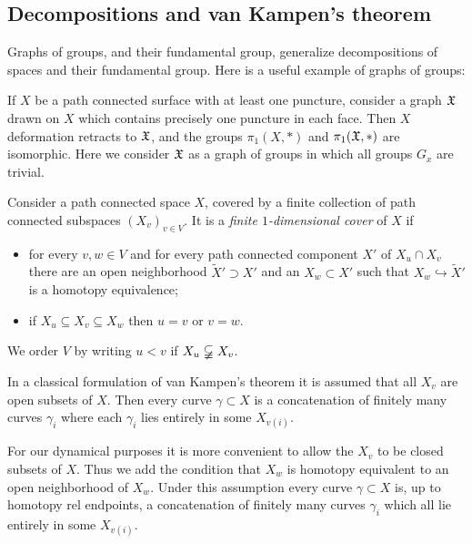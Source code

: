 \documentclass{amsart}
\begin{document}
\subsection{Decompositions and van Kampen's theorem}\label{ss:vk}
Graphs of groups, and their fundamental group, generalize decompositions of
spaces and their fundamental group. Here is a useful example of graphs of
groups:
\begin{exple}
  If $X$ be a path connected surface with at least one puncture, consider a
  graph ${\mathfrak X}$ drawn on $X$ which contains precisely one puncture in each
  face. Then $X$ deformation retracts to ${\mathfrak X}$, and the groups $\pi_1(X,*)$
  and $\pi_1({\mathfrak X},*)$ are isomorphic. Here we consider ${\mathfrak X}$ as a graph of
  groups in which all groups $G_x$ are trivial.
\end{exple}

\begin{defn}\label{defn:1dimcovers}
  Consider a path connected space $X$, covered by a finite collection
  of path connected subspaces $(X_v)_{v\in V}$. It is a \emph{finite
    $1$-dimensional cover} of $X$ if
  \begin{itemize}
  \item for every $v,w\in V$ and for every path connected component $X'$ of
    $X_{u}\cap X_{v}$ there are an open neighborhood $\widetilde X'\supset
    X'$ and an $X_{w}\subset X'$ such that $X_{w}\hookrightarrow \widetilde
    X'$ is a homotopy equivalence;
  \item if $X_{u}\subseteq X_{v}\subseteq X_{w}$ then $u=v$ or $v=w$.
  \end{itemize}
  We order $V$ by writing $u<v$ if $X_{u}\varsubsetneqq X_{v}$.
\end{defn}

\begin{rem}\label{rem:OnFinitnOfDecomp}
  In a classical formulation of van Kampen's theorem it is assumed that all
  $X_v$ are open subsets of $X$. Then every curve $\gamma\subset X$ is a
  concatenation of finitely many curves $\gamma_i$ where each $\gamma_i$
  lies entirely in some $X_{v(i)}$.

  For our dynamical purposes it is more convenient to allow the $X_v$ to be
  closed subsets of $X$. Thus we add the condition that $X_w$ is homotopy
  equivalent to an open neighborhood of $X_w$. Under this assumption every
  curve $\gamma\subset X$ is, up to homotopy rel endpoints, a concatenation of
  finitely many curves $\gamma_i$ which all lie entirely in some
  $X_{v(i)}$.
\end{rem}
\end{document}
